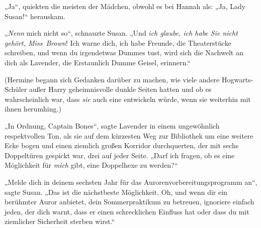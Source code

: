 „Ja“, quiekten die meisten der Mädchen, obwohl es bei Hannah als: „Ja, Lady Susan!“ herauskam.

„\emph{Nenn} mich nicht so“, schnauzte Susan. „Und \emph{ich glaube, ich habe Sie nicht gehört, Miss~Brown}! Ich warne dich, ich habe Freunde, die Theaterstücke schreiben, und wenn du irgendetwas Dummes tust, wird sich die Nachwelt an dich als Lavender, die Erstaunlich Dumme Geisel, erinnern.“

(Hermine begann sich Gedanken darüber zu machen, wie viele andere Hogwarts-Schüler außer Harry geheimnisvolle dunkle Seiten hatten und ob es wahrscheinlich war, dass \emph{sie} auch eine entwickeln würde, wenn sie weiterhin mit ihnen herumhing.)

„In Ordnung, Captain Bones“, sagte Lavender in einem ungewöhnlich respektvollen Ton, als sie auf dem kürzesten Weg zur Bibliothek um eine weitere Ecke bogen und einen ziemlich großen Korridor durchquerten, der mit sechs Doppeltüren gespickt war, drei auf jeder Seite. „Darf ich fragen, ob es eine Möglichkeit für \emph{mich} gibt, eine Doppelhexe zu werden?“

„Melde dich in deinem sechsten Jahr für das Aurorenvorbereitungsprogramm an“, sagte Susan. „Das ist die nächstbeste Möglichkeit. Oh, und wenn dir ein berühmter Auror anbietet, dein Sommerpraktikum zu betreuen, ignoriere einfach jeden, der dich warnt, dass er einen schrecklichen Einfluss hat oder dass du mit ziemlicher Sicherheit sterben wirst.“

